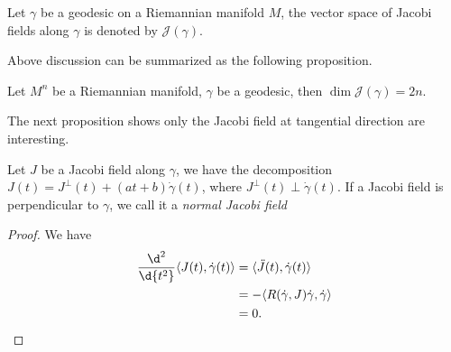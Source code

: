 \begin{symb}
    Let $\gamma$ be a geodesic on a Riemannian manifold $M$, the vector space of Jacobi fields along $\gamma$ is denoted by $\mathscr{J}(\gamma)$.
\end{symb}

Above discussion can be summarized as the following proposition.

\begin{prop}
    Let $M^n$ be a Riemannian manifold, $\gamma$ be a geodesic, then $\dim\mathscr{J}(\gamma)=2n$.
\end{prop}

The next proposition shows only the Jacobi field at tangential direction are interesting.
\begin{prop}\label{decomposition of Jacobi fields}
    Let $J$ be a Jacobi field along $\gamma$, we have the decomposition $J(t)=J^\perp(t)+(at+b)\dot{\gamma}(t)$, where $J^\perp(t)\perp\dot{\gamma}(t)$.
    If a Jacobi field is perpendicular to $\gamma$, we call it a \emph{normal Jacobi field}
\end{prop}
\begin{proof}
    We have
    \begin{align*}
        \frac{\d^2{}}{\d{t^2}}\langle J(t),\dot{\gamma}(t)\rangle&=\langle\ddot{J}(t),\dot{\gamma}(t)\rangle\\
        &=-\langle R(\dot{\gamma},J)\dot{\gamma},\dot{\gamma}\rangle\\
        &=0.\qedhere
    \end{align*}
\end{proof}

